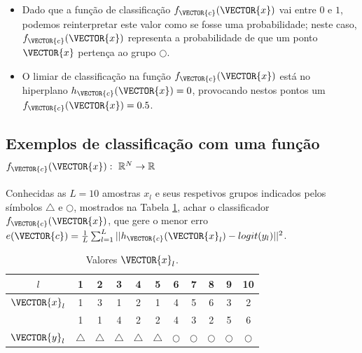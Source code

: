 \begin{tcbattention}
\begin{itemize}
\item Dado que a função de classificação $f_{\VECTOR{c}}(\VECTOR{x})$ vai entre $0$ e $1$,
podemos reinterpretar este valor como se fosse uma probabilidade;
neste caso, $f_{\VECTOR{c}}(\VECTOR{x})$ representa a probabilidade de que um ponto $\VECTOR{x}$
pertença ao grupo $\bigcirc$.
\item O limiar de classificação na função $f_{\VECTOR{c}}(\VECTOR{x})$ está no hiperplano $h_{\VECTOR{c}}(\VECTOR{x})=0$,
provocando nestos pontos um $f_{\VECTOR{c}}(\VECTOR{x})=0.5$.
\end{itemize}
\end{tcbattention}



\subsection{Exemplos de classificação com uma função
$f_{\VECTOR{c}}(\VECTOR{x}):~\mathbb{R}^N \rightarrow \mathbb{R}$ }

\begin{example}\label{ex:theo:reglogrnr1}
Conhecidas as $L=10$ amostras $x_l$ e seus respetivos grupos indicados pelos símbolos $\bigtriangleup$ e $\bigcirc$, 
mostrados na Tabela \ref{table:theo:reglogrnr1:xn},
achar o classificador $f_{\VECTOR{c}}(\VECTOR{x})$, 
que gere o menor erro $e(\VECTOR{c}) =  \frac{1}{L}\sum_{l=1}^{L} ||h_{\VECTOR{c}}(\VECTOR{x}_l)-logit(y_l)||^2$.
\end{example}


\begin{table}[h!]
\centering
\begin{tabular}{|c||c|c|c|c|c||c|c|c|c|c||} 
 \hline
$l$            & 1 & 2 & 3 & 4 & 5 & 6 & 7 & 8 & 9 & 10 \\ \hline \hline
$\VECTOR{x}_l$ & 1 & 3 & 1 & 2 & 1 & 4 & 5 & 6 & 3 & 2 \\ 
~              & 1 & 1 & 4 & 2 & 2 & 4 & 3 & 2 & 5 & 6 \\ \hline
$\VECTOR{y}_l$ & $\bigtriangleup$ & $\bigtriangleup$ & $\bigtriangleup$ & $\bigtriangleup$ & $\bigtriangleup$ 
      & $\bigcirc$ & $\bigcirc$ & $\bigcirc$ & $\bigcirc$ & $\bigcirc$\\ \hline
\end{tabular}
\caption{Valores $\VECTOR{x}_l$.}
\label{table:theo:reglogrnr1:xn}
\end{table}


